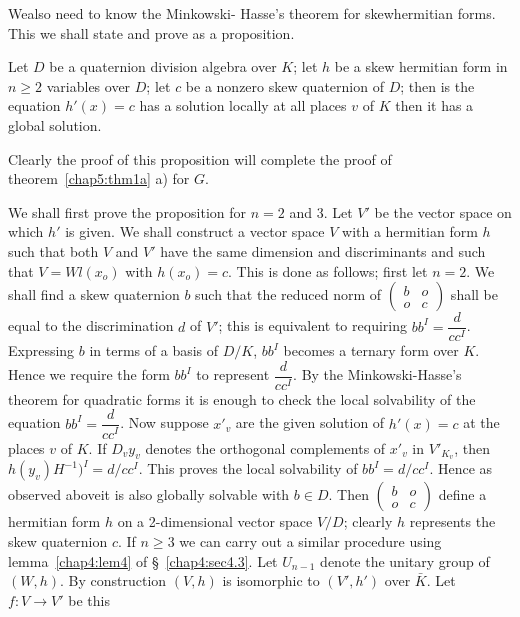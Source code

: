  We\pageoriginale also need to know the Minkowski- Hasse's theorem for
 skewhermitian forms. This we shall state and prove as a proposition.   
      
\begin{prop*}
Let $D$ be a quaternion division algebra over $K$; let $h$ be a skew
hermitian form in $n \ge 2$ variables over $D$; let $c$ be a nonzero
skew quaternion of $D$; then is the equation $h'(x)=c$ has a solution
locally at all places $v$ of $K$ then it has a global solution. 
\end{prop*}   
         
Clearly the proof of this proposition will complete the proof of
theorem~\ref{chap5:thm1a} a) for $G$. 

\medskip
{}
We shall first prove the proposition for $n=2$ and 3. Let $V'$ be
the vector space on which $h'$ is given. We shall construct a vector
space $V$ with a hermitian form $h$ such that both $V$ and $V'$ have
the same dimension and discriminants and such that $V=Wl(x_o)$ with
$h(x_o)=c$. This is done as follows; first let $n=2$. We shall find a
skew quaternion $b$ such that the reduced norm of $\begin{pmatrix} b &o
  \\o &c \end{pmatrix} $ shall be equal to the discrimination $d$ of
$V'$; this is equivalent to requiring $bb^I=
\dfrac{d}{cc^I}$. Expressing $b$ in terms of a basis of $D/K$, $bb^I$
becomes a ternary form over $K$. Hence we require the form $bb^I$ to
represent $\dfrac{d}{cc^I}$. By the Minkowski-Hasse's theorem for
quadratic forms it is enough to check the local solvability of the
equation $bb^I=\dfrac{d}{cc^I}$. Now suppose $x'_v$ are the given
solution of $h'(x)=c $ at the places $v$ of $K$. If  $D_vy_v$ denotes
the orthogonal complements of $x'_v$ in $V'_{K_v}$, then
$h(y_v)H^{-1})^I=d/cc^I$. This proves the local solvability of
$bb^I=d/cc^I$. Hence as observed above\pageoriginale it is also
globally solvable 
with $b \in D$. Then $\begin{pmatrix} b &o \\o &c \end{pmatrix} $
define a hermitian form $h$ on a 2-dimensional vector space $V/D$;
clearly $h$ represents the skew quaternion $c$. If $n \ge 3$ we can
carry out a similar procedure using lemma~\ref{chap4:lem4} of 
\S~\ref{chap4:sec4.3}. Let 
$U_{n-1}$ denote the unitary group of $(W,h)$. By construction $(V,h)$
is isomorphic to $(V', h')$ over $\bar{K}$. Let $f:V \to V'$ be this
